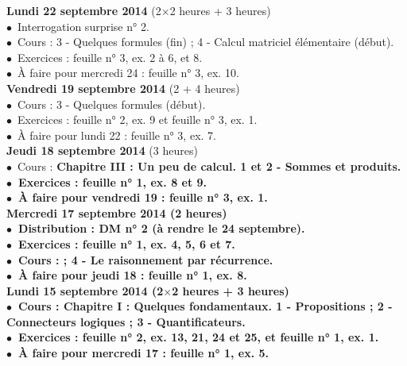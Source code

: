 \documentclass[12pt,a4paper]{article}
\begin{document}
\noindent\textbf{ \bf Lundi 22 septembre 2014 \rm}(2$\times$2 heures + 3
heures)\\
$\bullet$\ Interrogation surprise n° 2.\\
$\bullet$\ Cours : 3 - Quelques formules (fin) ; 4 - Calcul matriciel
élémentaire (début).\\
$\bullet$\ Exercices : feuille n° 3, ex. 2 à 6, et 8.\\
$\bullet$\ À faire pour mercredi 24 : feuille n° 3, ex. 10.\vspace{.4cm}\\


\noindent\textbf{ \bf Vendredi 19 septembre 2014 \rm}(2 + 4 heures)\\
$\bullet$\ Cours : 3 - Quelques formules (début).\\
$\bullet$\ Exercices : feuille n° 2, ex. 9 et feuille n° 3, ex. 1.\\
$\bullet$\ À faire pour lundi 22 : feuille n° 3, ex. 7.\vspace{.4cm}\\

\noindent\textbf{ \bf Jeudi 18 septembre 2014 \rm}(3 heures)\\
$\bullet$\ Cours : \bf Chapitre III \rm : Un peu de calcul. 1 et 2 - Sommes
et produits.\\
$\bullet$\ Exercices : feuille n° 1, ex. 8 et 9.\\
$\bullet$\ À faire pour vendredi 19 : feuille n° 3, ex. 1.\vspace{.4cm}\\

\noindent\textbf{ \bf Mercredi 17 septembre 2014 \rm}(2 heures)\\
$\bullet$\ Distribution : DM n° 2 (à rendre le 24 septembre).\\
$\bullet$\ Exercices : feuille n° 1, ex. 4, 5, 6 et 7.\\
$\bullet$\ Cours :  ; 4 - Le raisonnement par récurrence.\\
$\bullet$\ À faire pour jeudi 18 : feuille n° 1, ex. 8.\vspace{.4cm}\\
 
\noindent\textbf{ \bf Lundi 15 septembre 2014 \rm}(2$\times$2 heures + 3
heures)\\
$\bullet$\ Cours : \bf Chapitre I \rm : Quelques fondamentaux. 1 -
Propositions ; 2 - Connecteurs logiques ; 3 - Quantificateurs.\\
$\bullet$\ Exercices : feuille n° 2, ex. 13, 21, 24 et 25, et feuille n°
1, ex. 1.\\
$\bullet$\ À faire pour mercredi 17 : feuille n° 1, ex. 5.\vspace{.4cm}\\
\end{document}
